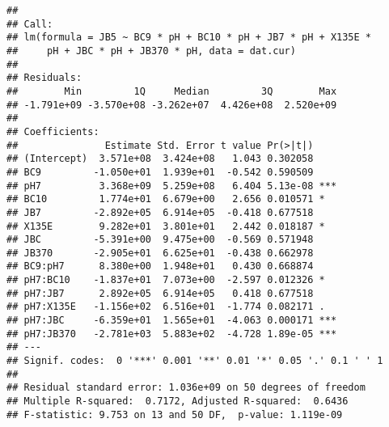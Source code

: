 \documentclass[
]{article}
\newenvironment{Shaded}{\begin{snugshade}}{\end{snugshade}}
\newcommand{\AttributeTok}[1]{\textcolor[rgb]{0.13,0.29,0.53}{#1}}
\newcommand{\DecValTok}[1]{\textcolor[rgb]{0.00,0.00,0.81}{#1}}
\newcommand{\FunctionTok}[1]{\textcolor[rgb]{0.13,0.29,0.53}{\textbf{#1}}}
\newcommand{\NormalTok}[1]{#1}
\newcommand{\OtherTok}[1]{\textcolor[rgb]{0.56,0.35,0.01}{#1}}
\newcommand{\SpecialCharTok}[1]{\textcolor[rgb]{0.81,0.36,0.00}{\textbf{#1}}}
\begin{document}
\begin{Shaded}
\end{Shaded}

\begin{verbatim}
## 
## Call:
## lm(formula = JB5 ~ BC9 * pH + BC10 * pH + JB7 * pH + X135E * 
##     pH + JBC * pH + JB370 * pH, data = dat.cur)
## 
## Residuals:
##        Min         1Q     Median         3Q        Max 
## -1.791e+09 -3.570e+08 -3.262e+07  4.426e+08  2.520e+09 
## 
## Coefficients:
##               Estimate Std. Error t value Pr(>|t|)    
## (Intercept)  3.571e+08  3.424e+08   1.043 0.302058    
## BC9         -1.050e+01  1.939e+01  -0.542 0.590509    
## pH7          3.368e+09  5.259e+08   6.404 5.13e-08 ***
## BC10         1.774e+01  6.679e+00   2.656 0.010571 *  
## JB7         -2.892e+05  6.914e+05  -0.418 0.677518    
## X135E        9.282e+01  3.801e+01   2.442 0.018187 *  
## JBC         -5.391e+00  9.475e+00  -0.569 0.571948    
## JB370       -2.905e+01  6.625e+01  -0.438 0.662978    
## BC9:pH7      8.380e+00  1.948e+01   0.430 0.668874    
## pH7:BC10    -1.837e+01  7.073e+00  -2.597 0.012326 *  
## pH7:JB7      2.892e+05  6.914e+05   0.418 0.677518    
## pH7:X135E   -1.156e+02  6.516e+01  -1.774 0.082171 .  
## pH7:JBC     -6.359e+01  1.565e+01  -4.063 0.000171 ***
## pH7:JB370   -2.781e+03  5.883e+02  -4.728 1.89e-05 ***
## ---
## Signif. codes:  0 '***' 0.001 '**' 0.01 '*' 0.05 '.' 0.1 ' ' 1
## 
## Residual standard error: 1.036e+09 on 50 degrees of freedom
## Multiple R-squared:  0.7172, Adjusted R-squared:  0.6436 
## F-statistic: 9.753 on 13 and 50 DF,  p-value: 1.119e-09
\end{verbatim}
\end{document}
